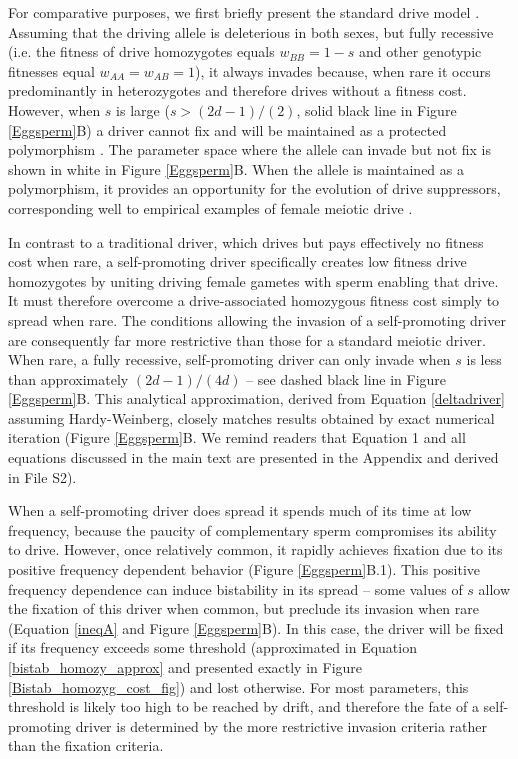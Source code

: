 \documentclass[12pt,letterpaper]{article}
\begin{document}
For comparative purposes, we first briefly present the standard drive model 
	\citep[see e.g. ][ for additional results]{Prout1973,Ubeda2004}. 
Assuming that the driving allele is deleterious in both sexes, but fully recessive 
	(i.e. the fitness of drive homozygotes equals $w_{BB}=1-s$ and other genotypic fitnesses equal $w_{AA}=w_{AB}=1$), 
	it always invades because,  when rare it occurs predominantly in heterozygotes and therefore drives without a fitness cost. 
However, when $s$ is large ($s>(2d-1)/(2)$, solid black line in Figure \ref{Eggsperm}B) a driver cannot fix and
will be maintained as a protected polymorphism \citep{Prout1973}. 
The parameter space where the allele can invade but not fix is shown in white
        in Figure \ref{Eggsperm}B. %
When the allele is maintained as a polymorphism, it provides an opportunity for the evolution of
	drive suppressors, corresponding well to empirical examples of
        female meiotic drive \citep[reviewed in ][]{Burt2006}. \newline 

In contrast to a traditional driver, which drives but pays effectively
	no fitness cost when rare, 
a self-promoting driver specifically creates low fitness drive homozygotes 
	by uniting driving female gametes with sperm enabling that drive.
It must therefore overcome a drive-associated homozygous fitness cost simply to spread when rare. 
The conditions allowing the invasion of a self-promoting driver
 	are consequently far more restrictive than those for a standard meiotic driver.
When rare, a fully recessive, self-promoting driver can only invade when $s$ 
	is less than approximately $(2 d - 1)/(4 d)$ -- see dashed black line in Figure \ref{Eggsperm}B. 
This analytical approximation, derived from Equation \eqref{deltadriver} assuming Hardy-Weinberg, 
	closely matches results obtained by exact numerical iteration (Figure \ref{Eggsperm}B. We remind readers that Equation 1 and all equations discussed in the main text are presented in the Appendix and derived in File S2). \newline 



When a self-promoting driver does spread 
	it spends much of its time at low frequency, 
	because the paucity of complementary sperm compromises its ability to drive. 
However, once relatively common, it  rapidly achieves fixation due to its
	positive frequency dependent behavior (Figure \ref{Eggsperm}B.1).  
This positive frequency dependence can 
	induce bistability in its spread -- some values of $s$ 
	allow the fixation of this driver when common, but 
	preclude its invasion when rare (Equation \ref{ineqA} and Figure \ref{Eggsperm}B). 
In this case, the driver will be fixed if its frequency exceeds some threshold 
	(approximated in Equation \ref{bistab_homozy_approx} and  presented exactly in 
	Figure \ref{Bistab_homozyg_cost_fig}) and lost otherwise. 
For most parameters, this threshold is likely too high to be reached by drift, 
	and therefore  the fate of a self-promoting driver is determined
	by the more restrictive invasion criteria rather than the fixation criteria. \newline 
\end{document}
